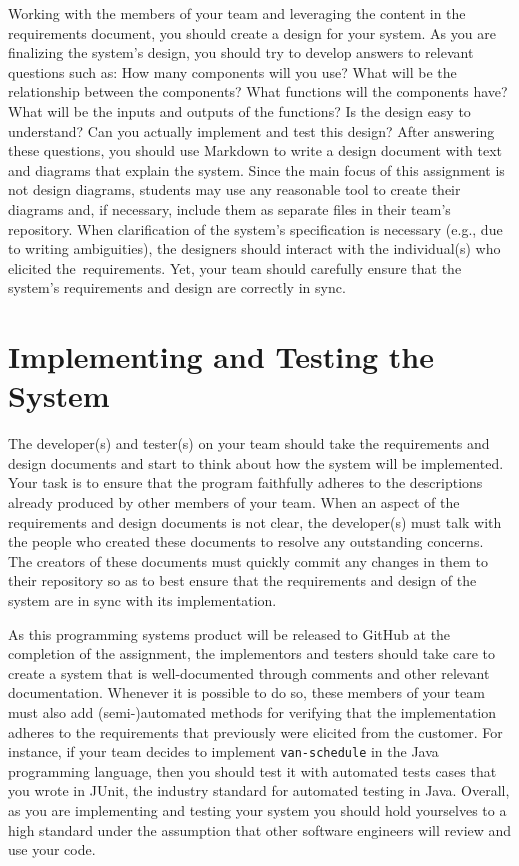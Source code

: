 Working with the members of your team and leveraging the content in the requirements document, you should create a
design for your system.  As you are finalizing the system's design, you should try to develop answers to relevant
questions such as: How many components will you use? What will be the relationship between the components? What
functions will the components have? What will be the inputs and outputs of the functions?  Is the design easy to
understand?  Can you actually implement and test this design? After answering these questions, you should use Markdown
to write a design document with text and diagrams that explain the system. Since the main focus of this assignment is
not design diagrams, students may use any reasonable tool to create their diagrams and, if necessary, include them as
separate files in their team's repository. When clarification of the system's specification is necessary (e.g., due to
writing ambiguities), the designers should interact with the individual(s) who elicited \mbox{the requirements}. Yet,
your team should carefully ensure that the system's requirements and design are correctly in sync.

\section*{Implementing and Testing the System}

The developer(s) and tester(s) on your team should take the requirements and design documents and start to think about
how the system will be implemented. Your task is to ensure that the program faithfully adheres to the descriptions
already produced by other members of your team. When an aspect of the requirements and design documents is not clear,
the developer(s) must talk with the people who created these documents to resolve any outstanding concerns. The creators
of these documents must quickly commit any changes in them to their repository so as to best ensure that the
requirements and design of the system are in sync with its implementation.

As this programming systems product will be released to GitHub at the completion of the assignment, the implementors and
testers should take care to create a system that is well-documented through comments and other relevant documentation.
Whenever it is possible to do so, these members of your team must also add (semi-)automated methods for verifying that
the implementation adheres to the requirements that previously were elicited from the customer. For instance, if your
team decides to implement {\tt van-schedule} in the Java programming language, then you should test it with automated
tests cases that you wrote in JUnit, the industry standard for automated testing in Java. Overall, as you are
implementing and testing your system you should hold yourselves to a high standard under the assumption that other
software engineers will review and use your code.

